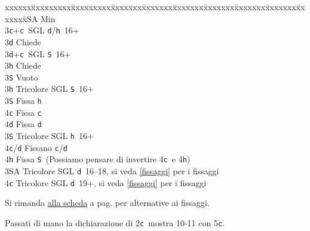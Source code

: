 \documentclass[a4paper,italian]{article}
\newcommand{\BS}{\small{\texttt{S}}}
\newcommand{\BC}{\small{\texttt{c}}}
\newcommand{\BD}{\small{\texttt{d}}}
\newcommand{\BH}{\small{\texttt{h}}}
\newenvironment{bidtable}
{\begin{tabbing}

    xxxxxx\=xxxxxxxxx\=xxxxxxxxx\=xxxxxxx\=xxxxxxx\=xxxxxxx\=xxxxxxx\=xxxxxxx\=xxxxxxx\=xxxxxxx\=\kill}
{\end{tabbing} }%
\begin{document}
\begin{bidtable}
    3\small{SA} \> Min\-\-\\
    3\BC {}+\BC\ SGL \BD /\BH\ 16+\+\\
    3\BD \> Chiede\-\\
    3\BD {}+\BC\ SGL \BS\ 16+\+\\
    3\BH \> Chiede\+\\
    3\BS \> Vuoto\-\-\\
    3\BH \> Tricolore SGL \BS\ 16+\+\\
    3\BS \> Fissa \BH \\
    4\BC \> Fissa \BC \\
    4\BD \> Fissa \BD \-\\
    3\BS \> Tricolore SGL \BH\ 16+\+\\
    4\BC/\BD \> Fissano \BC /\BD \\
    4\BH \> Fissa \BS\ (Possiamo pensare di invertire 4\BC\ e 4\BH )\-\\
    3\small{SA} \> Tricolore SGL \BD\ 16--18, si veda \ref{fissaggi} per i fissaggi\\
    4\BC \> Tricolore SGL \BD\ 19+, si veda \ref{fissaggi} per i fissaggi\\
\end{bidtable}
\bigbreak
Si rimanda \hyperref[fissaggi]{alla scheda} a pag. \pageref{fissaggi} per alternative ai fissaggi.

Passati di mano la dichiarazione di 2\BC\ mostra 10-11 con 5\BC .
\end{document}

